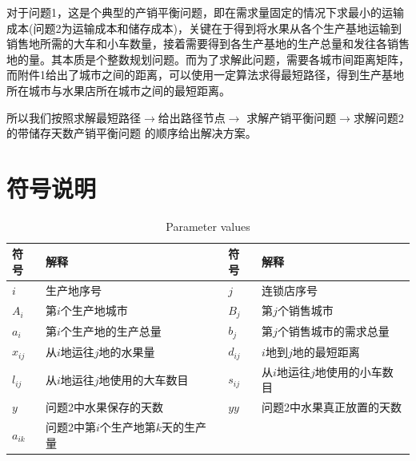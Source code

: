 \documentclass{article}
\begin{document}
	对于问题1，这是个典型的产销平衡问题，即在需求量固定的情况下求最小的运输成本(问题2为运输成本和储存成本)，关键在于得到将水果从各个生产基地运输到销售地所需的大车和小车数量，接着需要得到各生产基地的生产总量和发往各销售地的量。其本质是个整数规划问题。而为了求解此问题，需要各城市间距离矩阵，而附件1给出了城市之间的距离，可以使用一定算法求得最短路径，得到生产基地所在城市与水果店所在城市之间的最短距离。
	
	所以我们按照求解最短路径$\rightarrow $给出路径节点$\rightarrow$ 求解产销平衡问题$\rightarrow $求解问题2的带储存天数产销平衡问题 的顺序给出解决方案。
	\section{符号说明}
\begin{table}[H]
	\centering
	\caption{Parameter values}

		\begin{tabularx}{\textwidth}{llll}
			\toprule[1.5pt]
			符号&解释&符号&解释\\
			\midrule
			$i$&生产地序号&$j$&连锁店序号\\
			$A_i$&第$i$个生产地城市&$B_j$&第$j$个销售城市\\
			$a_i$&第$i$个生产地的生产总量&$b_j$&第$j$个销售城市的需求总量\\
			$x_{ij}$&从$i$地运往$j$地的水果量&$d_{ij}$&$i$地到$j$地的最短距离\\
			$l_{ij}$&从$i$地运往$j$地使用的大车数目&$s_{ij}$&从$i$地运往$j$地使用的小车数目\\
			$y$&问题2中水果保存的天数	&$yy$&问题2中水果真正放置的天数\\
			$a_{ik}$&问题2中第$i$个生产地第$k$天的生产量 & &\\
			\bottomrule[1.5pt]
	\end{tabularx}
\end{table}
\end{document}
